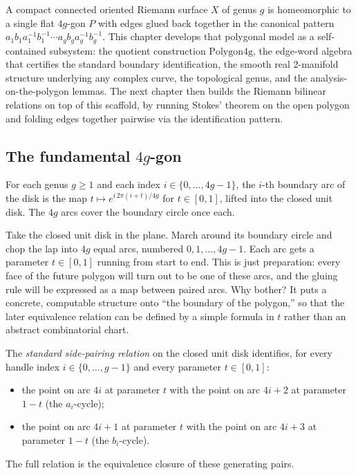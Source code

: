 A compact connected oriented Riemann surface \(X\) of genus \(g\) is
homeomorphic to a single flat \(4g\)-gon \(P\) with edges glued back
together in the canonical pattern
\(a_1b_1a_1^{-1}b_1^{-1}\cdots a_gb_ga_g^{-1}b_g^{-1}\). This chapter
develops that polygonal model as a self-contained subsystem: the
quotient construction \(\mathrm{Polygon4g}\), the edge-word algebra
that certifies the standard boundary identification, the smooth real
2-manifold structure underlying any complex curve, the topological
genus, and the analysis-on-the-polygon lemmas. The next chapter then
builds the Riemann bilinear relations on top of this scaffold, by
running Stokes' theorem on the open polygon and folding edges
together pairwise via the identification pattern.

\subsection{The fundamental \(4g\)-gon}

\begin{definition}
\label{def:polygon4g-boundary-param}
For each genus \(g\geq 1\) and each index \(i\in\{0,\ldots,4g-1\}\),
the \(i\)-th boundary arc of the disk is the map
\(t\mapsto e^{i\,2\pi(i+t)/4g}\) for \(t\in[0,1]\), lifted into the
closed unit disk. The \(4g\) arcs cover the boundary circle once
each.
\leanok
\end{definition}

\begin{layman}
Take the closed unit disk in the plane. March around its boundary
circle and chop the lap into \(4g\) equal arcs, numbered
\(0,1,\ldots,4g-1\). Each arc gets a parameter \(t\in[0,1]\)
running from start to end. This is just preparation: every face of
the future polygon will turn out to be one of these arcs, and the
gluing rule will be expressed as a map between paired arcs. Why
bother? It puts a concrete, computable structure onto ``the
boundary of the polygon,'' so that the later equivalence relation
can be defined by a simple formula in \(t\) rather than an abstract
combinatorial chart.
\end{layman}

\begin{definition}
\label{def:polygon4g-side-rel}
The \emph{standard side-pairing relation} on the closed unit disk
identifies, for every handle index \(i\in\{0,\ldots,g-1\}\) and every
parameter \(t\in[0,1]\):
\begin{itemize}
  \item the point on arc \(4i\) at parameter \(t\) with the point on
    arc \(4i+2\) at parameter \(1-t\) (the \(a_i\)-cycle);
  \item the point on arc \(4i+1\) at parameter \(t\) with the point on
    arc \(4i+3\) at parameter \(1-t\) (the \(b_i\)-cycle).
\end{itemize}
The full relation is the equivalence closure of these generating
pairs.
\leanok
\end{definition}

